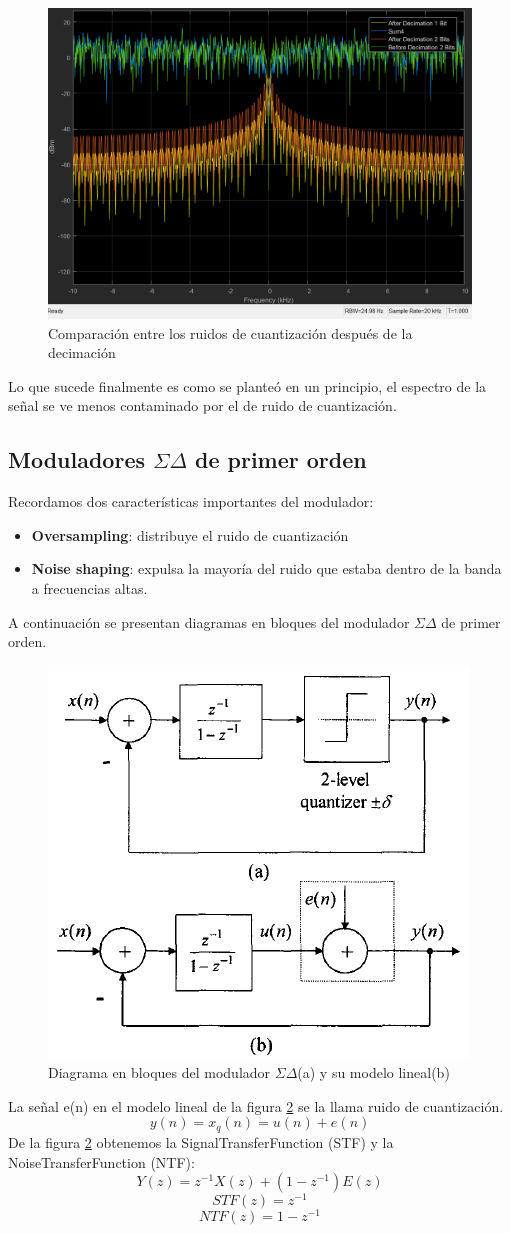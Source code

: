 \documentclass[assd_tp3_main.tex]{subfiles}
\begin{document}
\begin{figure}[H]
\centering
\includegraphics[width=1\linewidth]{images/ej4/AfterDecimationNoise.png}
\caption{Comparación entre los ruidos de cuantización después de la decimación}
\label{fig:AfterDecimationNoise}
\end{figure}
Lo que sucede finalmente es como se planteó en un principio, el espectro de la señal se ve menos contaminado por el de ruido de cuantización.

\subsection{Moduladores $\Sigma\Delta$ de primer orden }
Recordamos dos características importantes del modulador:
\begin{itemize}
\item \textbf{Oversampling}: distribuye el ruido de cuantización 
\item \textbf{Noise shaping}: expulsa la mayoría del ruido que estaba dentro de la banda a frecuencias altas. 
\end{itemize}
A continuación se presentan diagramas en bloques del modulador $\Sigma\Delta$ de primer orden.
\begin{figure}[H]
\centering
\includegraphics[width=0.4\linewidth]{images/ej4/sd_linmodel.png}
\caption{Diagrama en bloques del modulador $\Sigma\Delta$(a) y su modelo lineal(b)}
\label{fig:sigmadelmod_model}
\end{figure}
La señal e(n) en el modelo lineal de la figura \ref{fig:sigmadelmod_model} se la llama ruido de cuantización.
\[ y(n)=x_q(n)= u(n)+e(n) \]
De la figura \ref{fig:sigmadelmod_model} obtenemos la SignalTransferFunction (STF) y la NoiseTransferFunction (NTF):
\[ Y(z)= z^{-1}X(z)+(1-z^{-1})E(z) \]
\[ STF(z)= z^{-1} \]
\[ NTF(z)= 1-z^{-1} \]
\end{document}
